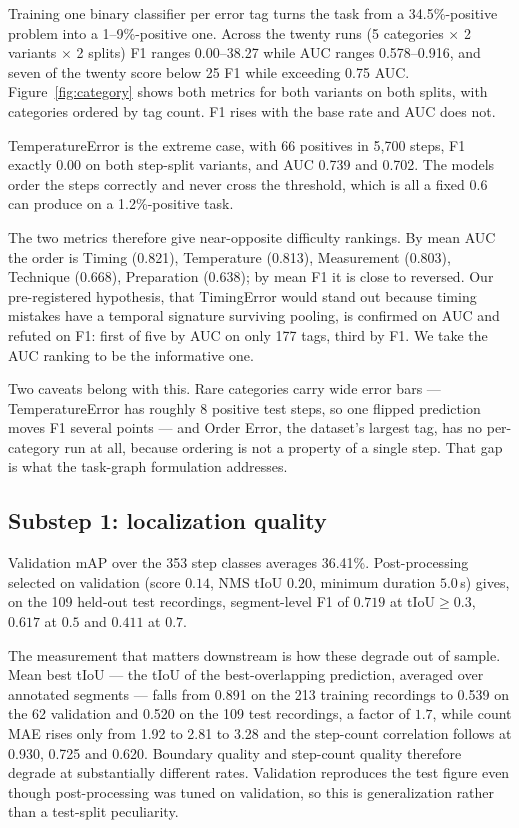 \documentclass[10pt,twocolumn,letterpaper]{article}
\begin{document}
Training one binary classifier per error tag turns the task from a 34.5\%-positive
problem into a 1--9\%-positive one. Across the twenty runs (5 categories $\times$ 2
variants $\times$ 2 splits) F1 ranges 0.00--38.27 while AUC ranges 0.578--0.916,
and seven of the twenty score below 25 F1 while exceeding 0.75 AUC.
Figure~\ref{fig:category} shows both metrics for both variants on both splits,
with categories ordered by tag count. F1 rises with the base rate and AUC does
not.

TemperatureError is the extreme case, with 66 positives in 5{,}700 steps, F1
exactly 0.00 on both step-split variants, and AUC 0.739 and 0.702. The models order
the steps correctly and never cross the threshold, which is all a fixed 0.6 can
produce on a 1.2\%-positive task.

The two metrics therefore give near-opposite difficulty rankings. By mean AUC the
order is Timing (0.821), Temperature (0.813), Measurement (0.803), Technique
(0.668), Preparation (0.638); by mean F1 it is close to reversed. Our
pre-registered hypothesis, that TimingError would stand out because timing mistakes
have a temporal signature surviving pooling, is confirmed on AUC and refuted on F1:
first of five by AUC on only 177 tags, third by F1. We take the AUC ranking to be
the informative one.

Two caveats belong with this. Rare categories carry wide error bars ---
TemperatureError has roughly 8 positive test steps, so one flipped prediction moves
F1 several points --- and Order Error, the dataset's largest tag, has no
per-category run at all, because ordering is not a property of a single step. That
gap is what the task-graph formulation addresses.

\subsection{Substep 1: localization quality}
\label{sec:loc}

Validation mAP over the 353 step classes averages 36.41\%. Post-processing selected
on validation (score $0.14$, NMS tIoU $0.20$, minimum duration $5.0$\,s) gives, on
the 109 held-out test recordings, segment-level F1 of $0.719$ at tIoU$\geq$0.3,
$0.617$ at $0.5$ and $0.411$ at $0.7$.

The measurement that matters downstream is how these degrade out of sample. Mean
best tIoU --- the tIoU of the best-overlapping prediction, averaged over annotated
segments --- falls from 0.891 on the 213 training recordings to 0.539 on the 62
validation and 0.520 on the 109 test recordings, a factor of $1.7$, while count MAE
rises only from 1.92 to 2.81 to 3.28 and the step-count correlation follows at
0.930, 0.725 and 0.620. Boundary quality and step-count quality therefore degrade at
substantially different rates. Validation reproduces the test figure even though
post-processing was tuned on validation, so this is generalization rather than a
test-split peculiarity.
\end{document}
